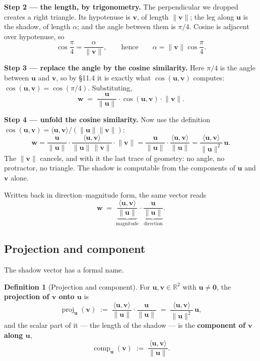\documentclass[11pt]{article}
\theoremstyle{definition}
\newtheorem{defn}{Definition}[section]
\theoremstyle{remark}
\newcommand{\R}{\mathbb{R}}
\newcommand{\vc}[1]{\mathbf{#1}}
\newcommand{\norm}[1]{\lVert #1\rVert}
\newcommand{\proj}[2]{\operatorname{proj}_{#1}(#2)}
\newcommand{\comp}[2]{\operatorname{comp}_{#1}(#2)}
\begin{document}
\smallskip
\noindent\textbf{Step 2 --- the length, by trigonometry.} The perpendicular we
dropped creates a right triangle. Its hypotenuse is $\vc{v}$, of length
$\norm{\vc{v}}$; the leg along $\vc{u}$ is the shadow, of length $\alpha$; and
the angle between them is $\pi/4$. Cosine is adjacent over hypotenuse, so
\[
  \cos\frac{\pi}{4} = \frac{\alpha}{\norm{\vc{v}}},
  \qquad\text{hence}\qquad
  \alpha = \norm{\vc{v}}\cos\frac{\pi}{4} .
\]

\smallskip
\noindent\textbf{Step 3 --- replace the angle by the cosine similarity.} Here
$\pi/4$ is the angle between $\vc{u}$ and $\vc{v}$, so by \S11.4 it is exactly
what $\cos(\vc{u},\vc{v})$ computes:
$\cos(\vc{u},\vc{v})=\cos(\pi/4)$. Substituting,
\[
  \vc{w} \;=\; \frac{\vc{u}}{\norm{\vc{u}}}\cdot\cos(\vc{u},\vc{v})\cdot\norm{\vc{v}} .
\]

\smallskip
\noindent\textbf{Step 4 --- unfold the cosine similarity.} Now use the
definition $\cos(\vc{u},\vc{v})=\langle\vc{u},\vc{v}\rangle/(\norm{\vc{u}}\norm{\vc{v}})$:
\[
  \vc{w}
  = \frac{\vc{u}}{\norm{\vc{u}}}
    \cdot\frac{\langle\vc{u},\vc{v}\rangle}{\norm{\vc{u}}\,\norm{\vc{v}}}
    \cdot\norm{\vc{v}}
  = \frac{\vc{u}}{\norm{\vc{u}}}\cdot\frac{\langle\vc{u},\vc{v}\rangle}{\norm{\vc{u}}}
  = \frac{\langle\vc{u},\vc{v}\rangle}{\norm{\vc{u}}^{2}}\,\vc{u} .
\]
The $\norm{\vc{v}}$ cancels, and with it the last trace of geometry: no angle,
no protractor, no triangle. The shadow is computable from the components of
$\vc{u}$ and $\vc{v}$ alone.

\smallskip
\noindent Written back in direction--magnitude form, the same vector reads
\[
  \vc{w}
  \;=\;
  \underbrace{\frac{\langle\vc{u},\vc{v}\rangle}{\norm{\vc{u}}}}_{\textstyle\text{magnitude}}
  \cdot
  \underbrace{\frac{\vc{u}}{\norm{\vc{u}}}}_{\textstyle\text{direction}} .
\]

\subsection{Projection and component}
The shadow vector has a formal name.

\begin{defn}[Projection and component]
For $\vc{u},\vc{v}\in\R^{2}$ with $\vc{u}\neq\vc{0}$, the \textbf{projection of
$\vc{v}$ onto $\vc{u}$} is
\[
  \proj{\vc{u}}{\vc{v}}
  \;:=\;
  \frac{\langle\vc{u},\vc{v}\rangle}{\norm{\vc{u}}}\cdot\frac{\vc{u}}{\norm{\vc{u}}}
  \;=\;
  \frac{\langle\vc{u},\vc{v}\rangle}{\norm{\vc{u}}^{2}}\,\vc{u} ,
\]
and the scalar part of it --- the length of the shadow --- is the
\textbf{component of $\vc{v}$ along $\vc{u}$},
\[
  \comp{\vc{u}}{\vc{v}} \;:=\; \frac{\langle\vc{u},\vc{v}\rangle}{\norm{\vc{u}}} .
\]
\end{defn}
\end{document}
